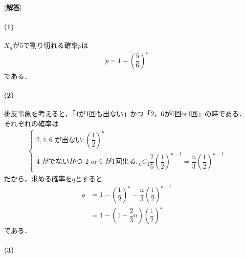 \documentclass[../../main.tex]{subfiles}
\begin{document}
\begin{oframed}
  
\end{oframed}

{\bf [解答]}

\paragraph{(1)}

$X_n$が$5$で割り切れる確率$p$は
\begin{align}
  p = 1 - \left(\dfrac{5}{6}\right)^n \label{eq:1}
\end{align}
である．

\paragraph{(2)}

排反事象を考えると，「4が1回も出ない」かつ「2，6が0回or1回」の時である．
それぞれの確率は
\begin{align}
  \begin{cases}
    \text{$2, 4, 6$ が出ない}: \left(\dfrac{1}{2}\right)^n \\
    \text{$4$ がでないかつ $2$ or $6$ が1回出る}: {}_n C_1 \dfrac{2}{6} \left(\dfrac{1}{2}\right)^{n-1} = \dfrac{n}{3}\left(\dfrac{1}{2}\right)^{n-1}
  \end{cases}
\end{align}
だから，求める確率を$q$とすると
\begin{align}
  q
  &= 1 - \left(\dfrac{1}{2}\right)^n - \dfrac{n}{3}\left(\dfrac{1}{2}\right)^{n-1} \\
  &= 1 - \left(1+\dfrac{2}{3}n\right)\left(\dfrac{1}{2}\right)^n \label{eq:2}
\end{align}
である．

\paragraph{(3)}
\end{document}
